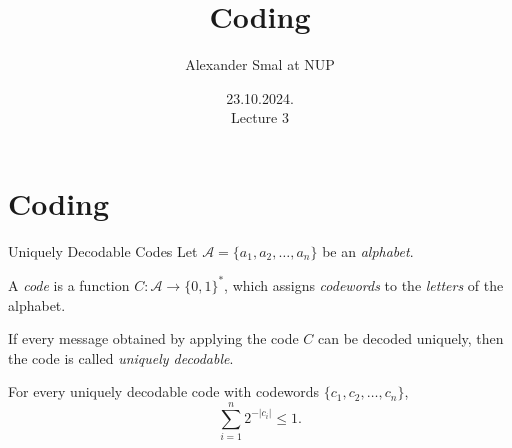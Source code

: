 \documentclass[handout,aspectratio=169]{beamer}
\title{Coding}
\author{Alexander Smal at NUP}
\date{23.10.2024.\\ Lecture 3}
\newcommand{\bits}{\{0,1\}}
\newcommand{\bitstr}{\bits^*}
\newcommand{\seqn}[2]{{#1}_1,{#1}_2,\dotsc,{#1}_{#2}}
\begin{document}
    \begin{frame}[plain]
        \maketitle
    \end{frame}

    \section{Coding}
    \begin{frame}{Uniquely Decodable Codes}
        Let $\mathcal{A} = \{\seqn{a}{n}\}$ be an \emph{alphabet}.
        \begin{definition}
            A \emph{code} is a function \(C:\mathcal{A}\to\bitstr\),
            which assigns \emph{codewords} to the \emph{letters} of the alphabet.

            If every message obtained by applying the code \(C\) can be decoded
            uniquely, then the code is called \emph{uniquely decodable}.
        \end{definition}

        \begin{theorem}\label{thm:mcmill}
            For every uniquely decodable code with codewords
            \(\{\seqn{c}{n}\}\),
            \[
            \sum_{i=1}^{n} 2^{-|c_i|} \le 1.
            \]
        \end{theorem}
    \end{frame}
\end{document}
